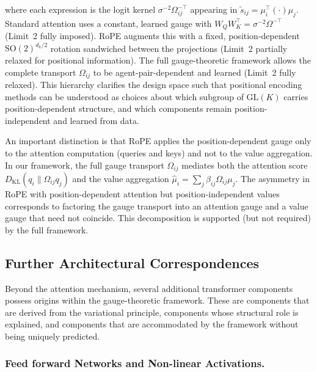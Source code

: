 \documentclass[twoside,11pt]{article}
\begin{document}
where each expression is the logit kernel $\sigma^{-2}\Omega_{ij}^{-\top}$ appearing in $\tilde{s}_{ij} = \mu_i^\top(\cdot)\mu_j$. Standard attention uses a constant, learned gauge with $W_Q W_K^\top = \sigma^{-2}\Omega^{-\top}$ (Limit~2 fully imposed). RoPE augments this with a fixed, position-dependent $\mathrm{SO}(2)^{d_k/2}$ rotation sandwiched between the projections (Limit~2 partially relaxed for positional information). The full gauge-theoretic framework allows the complete transport $\Omega_{ij}$ to be agent-pair-dependent and learned (Limit~2 fully relaxed). This hierarchy clarifies the design space such that positional encoding methods can be understood as choices about which subgroup of $\mathrm{GL}(K)$ carries position-dependent structure, and which components remain position-independent and learned from data.

An important distinction is that RoPE applies the position-dependent gauge only to the attention computation (queries and keys) and not to the value aggregation. In our framework, the full gauge transport $\Omega_{ij}$ mediates both the attention score $D_{\mathrm{KL}}(q_i \| \Omega_{ij} q_j)$ and the value aggregation $\hat\mu_i = \sum_j \beta_{ij} \Omega_{ij}\mu_j$. The asymmetry in RoPE with position-dependent attention but position-independent values corresponds to factoring the gauge transport into an attention gauge and a value gauge that need not coincide. This decomposition is supported (but not required) by the full framework.


\subsection{Further Architectural Correspondences}
\label{sec:further_correspondences}

Beyond the attention mechanism, several additional transformer components possess origins within the gauge-theoretic framework. These are components that are derived from the variational principle, components whose structural role is explained, and components that are accommodated by the framework without being uniquely predicted.

\subsubsection{Feed forward Networks and Non-linear Activations.}
\label{sec:ffn_nonlinearity}
\end{document}
